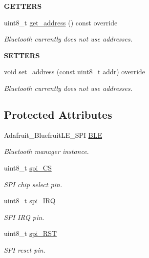 \begin{Indent}{\bf G\+E\+T\+T\+E\+RS}\par
\begin{DoxyCompactItemize}
\item 
uint8\+\_\+t \hyperlink{class_loom___bluetooth_a05e53b4b58b52d0b7068959b6246e9a2}{get\+\_\+address} () const override
\begin{DoxyCompactList}\small\item\em Bluetooth currently does not use addresses. \end{DoxyCompactList}\end{DoxyCompactItemize}
\end{Indent}
\begin{Indent}{\bf S\+E\+T\+T\+E\+RS}\par
\begin{DoxyCompactItemize}
\item 
void \hyperlink{class_loom___bluetooth_a963fd394e050a4b1fb12311d6fe8f97f}{set\+\_\+address} (const uint8\+\_\+t addr) override
\begin{DoxyCompactList}\small\item\em Bluetooth currently does not use addresses. \end{DoxyCompactList}\end{DoxyCompactItemize}
\end{Indent}
\subsection*{Protected Attributes}
\begin{DoxyCompactItemize}
\item 
Adafruit\+\_\+\+Bluefruit\+L\+E\+\_\+\+S\+PI \hyperlink{class_loom___bluetooth_a0f16366fb0573986b0205cfc73f02b7c}{B\+LE}
\begin{DoxyCompactList}\small\item\em Bluetooth manager instance. \end{DoxyCompactList}\item 
uint8\+\_\+t \hyperlink{class_loom___bluetooth_a111aeae48c0ea364b47b3d8f3536bd7c}{spi\+\_\+\+CS}
\begin{DoxyCompactList}\small\item\em S\+PI chip select pin. \end{DoxyCompactList}\item 
uint8\+\_\+t \hyperlink{class_loom___bluetooth_a8ef44f1f6220e7272aeca00a0991a3c7}{spi\+\_\+\+I\+RQ}
\begin{DoxyCompactList}\small\item\em S\+PI I\+RQ pin. \end{DoxyCompactList}\item 
uint8\+\_\+t \hyperlink{class_loom___bluetooth_a9b7f8f41e29fce31bcd8366e93edd7a6}{spi\+\_\+\+R\+ST}
\begin{DoxyCompactList}\small\item\em S\+PI reset pin. \end{DoxyCompactList}\end{DoxyCompactItemize}
